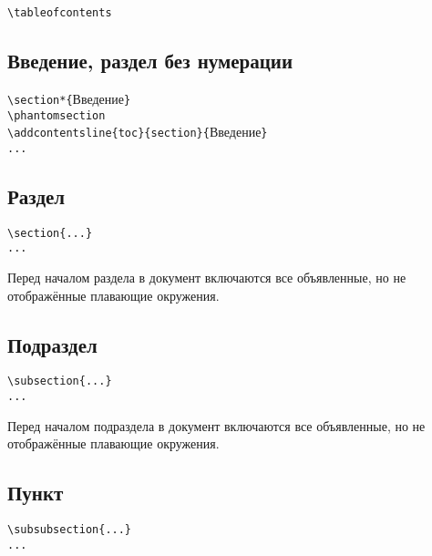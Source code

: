 \documentclass[14pt, a4paper, titlepage]{extarticle}
\renewcommand{\thesection}{\Asbuk{section}}
\let\oldsec\section
\renewcommand{\section}{
        \clearpage
        \phantomsection
        \refstepcounter{section}
        \setcounter{figure}{0} %
        \setcounter{table}{0} %
        \setcounter{equation}{0} %
        \addcontentsline{toc}{section}{\appendixname~\thesection}
        \oldsec*} %
\begin{document}
\begin{verbatim}
\tableofcontents
\end{verbatim}

\subsection{Введение, раздел без нумерации}

\noindent\verb"\section*{"Введение\verb"}"\\
\verb"\phantomsection"\\
\verb"\addcontentsline{toc}{section}{"Введение\verb"}"\\
\verb"..."

\subsection{Раздел}

\begin{verbatim}
\section{...}
...
\end{verbatim}

Перед началом раздела в документ включаются все объявленные, но не отображённые плавающие окружения.

\subsection{Подраздел}

\begin{verbatim}
\subsection{...}
...
\end{verbatim}

 Перед началом подраздела в документ включаются все объявленные, но не отображённые плавающие окружения.

\subsection{Пункт}

\begin{verbatim}
\subsubsection{...}
...
\end{verbatim}
\end{document}
